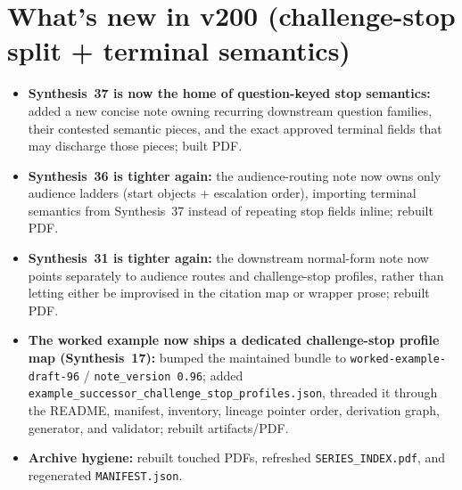 \documentclass[11pt]{article}
\begin{document}
\section{What's new in v200 (challenge-stop split + terminal semantics)}
\begin{itemize}[leftmargin=*]
\item \textbf{Synthesis~37 is now the home of question-keyed stop semantics:} added a new concise note owning recurring downstream question families, their contested semantic pieces, and the exact approved terminal fields that may discharge those pieces; built PDF.
\item \textbf{Synthesis~36 is tighter again:} the audience-routing note now owns only audience ladders (start objects + escalation order), importing terminal semantics from Synthesis~37 instead of repeating stop fields inline; rebuilt PDF.
\item \textbf{Synthesis~31 is tighter again:} the downstream normal-form note now points separately to audience routes and challenge-stop profiles, rather than letting either be improvised in the citation map or wrapper prose; rebuilt PDF.
\item \textbf{The worked example now ships a dedicated challenge-stop profile map (Synthesis~17):} bumped the maintained bundle to \texttt{worked-example-draft-96} / \texttt{note\_version 0.96}; added \texttt{example\_successor\_challenge\_stop\_profiles.json}, threaded it through the README, manifest, inventory, lineage pointer order, derivation graph, generator, and validator; rebuilt artifacts/PDF.
\item \textbf{Archive hygiene:} rebuilt touched PDFs, refreshed \texttt{SERIES\_INDEX.pdf}, and regenerated \texttt{MANIFEST.json}.
\end{itemize}
\end{document}
